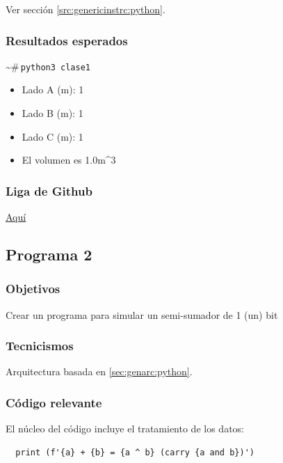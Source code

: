 \documentclass{article}[12pt,a4paper]
\newcommand{\bashps}{\textasciitilde\#\,}
\begin{document}
Ver sección \ref{src:genericinstrc:python}.

\subsubsection{Resultados esperados}

\bashps\texttt{python3 clase1}

\begin{itemize}
  \item[] Lado A (m): 1
  \item[] Lado B (m): 1
  \item[] Lado C (m): 1
  \item[] El volumen es 1.0m\textasciicircum3
\end{itemize}

\subsubsection{Liga de \textbf{Github}}

\href{https://github.com/MarcosHCK/master-programming/tree/master/clase1}{Aquí \faGithubSquare}

\subsection{Programa 2}

\subsubsection{Objetivos}

Crear un programa para simular un semi-sumador de 1 (un) bit

\subsubsection{Tecnicismos}

Arquitectura basada en \ref{sec:genarc:python}.

\subsubsection{Código relevante}

El núcleo del código incluye el tratamiento de los datos:

\begin{verbatim}
  print (f'{a} + {b} = {a ^ b} (carry {a and b})')
\end{verbatim}
\end{document}
